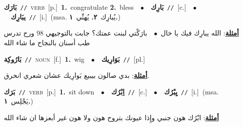 \documentclass[10pt,a4paper,twoside]{article} %
\begin{document}
\begin{multicols}{2}
{\setlength\topsep{0pt}\textbf{\foreignlanguage{arabic}{بَارَك}}\ {\color{gray}\texttt{//}\color{black}}\ \textsc{verb}\ [p.]\ \textbf{1.}~congratulate  \textbf{2.}~bless\ \ $\bullet$\ \ \setlength\topsep{0pt}\textbf{\foreignlanguage{arabic}{بَارِك}}\ {\color{gray}\texttt{//}\color{black}}\ [c.]\ \ $\bullet$\ \ \setlength\topsep{0pt}\textbf{\foreignlanguage{arabic}{يبَارِك}}\ {\color{gray}\texttt{//}\color{black}}\ [i.]\ \color{gray}(msa. \foreignlanguage{arabic}{يُبارِك}~\foreignlanguage{arabic}{\textbf{٢.}}  \foreignlanguage{arabic}{يُهنِّي}~\foreignlanguage{arabic}{\textbf{١.}})\color{black}\  \begin{flushright}\color{gray}\foreignlanguage{arabic}{\textbf{\underline{\foreignlanguage{arabic}{أمثلة}}}: الله يبارِك فيك يا خال\ $\bullet$\ \  بارَكْتي لبنت عمتك؟ جابت بالتوجيهي 98 ورح تدرس طب أسنان بالنجاح ما شاء الله}\end{flushright}\color{black}} \vspace{2mm}

{\setlength\topsep{0pt}\textbf{\foreignlanguage{arabic}{بَارُوكِة}}\ {\color{gray}\texttt{//}\color{black}}\ \textsc{noun}\ [f.]\ \textbf{1.}~wig\ \ $\bullet$\ \ \setlength\topsep{0pt}\textbf{\foreignlanguage{arabic}{بَوَارِيك}}\ {\color{gray}\texttt{//}\color{black}}\ [pl.]\  \begin{flushright}\color{gray}\foreignlanguage{arabic}{\textbf{\underline{\foreignlanguage{arabic}{أمثلة}}}: بدي صالون بيبيع بَوارِيك عشان شعري انحرق.}\end{flushright}\color{black}} \vspace{2mm}

{\setlength\topsep{0pt}\textbf{\foreignlanguage{arabic}{بَرَك}}\ {\color{gray}\texttt{//}\color{black}}\ \textsc{verb}\ [p.]\ \textbf{1.}~sit down\ \ $\bullet$\ \ \setlength\topsep{0pt}\textbf{\foreignlanguage{arabic}{اِبْرُك}}\ {\color{gray}\texttt{//}\color{black}}\ [c.]\ \ $\bullet$\ \ \setlength\topsep{0pt}\textbf{\foreignlanguage{arabic}{يِبْرُك}}\ {\color{gray}\texttt{//}\color{black}}\ [i.]\ \color{gray}(msa. \foreignlanguage{arabic}{يَجْلِس}~\foreignlanguage{arabic}{\textbf{١.}})\color{black}\  \begin{flushright}\color{gray}\foreignlanguage{arabic}{\textbf{\underline{\foreignlanguage{arabic}{أمثلة}}}: ابْرُك هون جنبي وإِذا عيونك بتروح هون ولا هون غير أبعزها ان شاء الله}\end{flushright}\color{black}} \vspace{2mm}


\end{multicols}
\end{document}
